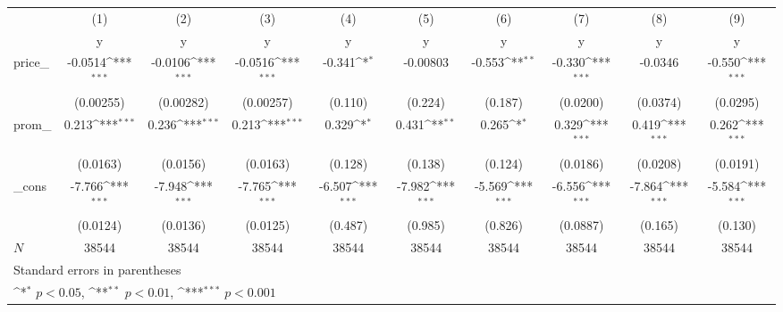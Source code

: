 {
\def\sym#1{\ifmmode^{#1}\else\(^{#1}\)\fi}
\begin{tabular}{l*{9}{c}}
\hline\hline
            &\multicolumn{1}{c}{(1)}&\multicolumn{1}{c}{(2)}&\multicolumn{1}{c}{(3)}&\multicolumn{1}{c}{(4)}&\multicolumn{1}{c}{(5)}&\multicolumn{1}{c}{(6)}&\multicolumn{1}{c}{(7)}&\multicolumn{1}{c}{(8)}&\multicolumn{1}{c}{(9)}\\
            &\multicolumn{1}{c}{y}&\multicolumn{1}{c}{y}&\multicolumn{1}{c}{y}&\multicolumn{1}{c}{y}&\multicolumn{1}{c}{y}&\multicolumn{1}{c}{y}&\multicolumn{1}{c}{y}&\multicolumn{1}{c}{y}&\multicolumn{1}{c}{y}\\
\hline
price\_      &     -0.0514\sym{***}&     -0.0106\sym{***}&     -0.0516\sym{***}&      -0.341\sym{*}  &    -0.00803         &      -0.553\sym{**} &      -0.330\sym{***}&     -0.0346         &      -0.550\sym{***}\\
            &   (0.00255)         &   (0.00282)         &   (0.00257)         &     (0.110)         &     (0.224)         &     (0.187)         &    (0.0200)         &    (0.0374)         &    (0.0295)         \\
[1em]
prom\_       &       0.213\sym{***}&       0.236\sym{***}&       0.213\sym{***}&       0.329\sym{*}  &       0.431\sym{**} &       0.265\sym{*}  &       0.329\sym{***}&       0.419\sym{***}&       0.262\sym{***}\\
            &    (0.0163)         &    (0.0156)         &    (0.0163)         &     (0.128)         &     (0.138)         &     (0.124)         &    (0.0186)         &    (0.0208)         &    (0.0191)         \\
[1em]
\_cons      &      -7.766\sym{***}&      -7.948\sym{***}&      -7.765\sym{***}&      -6.507\sym{***}&      -7.982\sym{***}&      -5.569\sym{***}&      -6.556\sym{***}&      -7.864\sym{***}&      -5.584\sym{***}\\
            &    (0.0124)         &    (0.0136)         &    (0.0125)         &     (0.487)         &     (0.985)         &     (0.826)         &    (0.0887)         &     (0.165)         &     (0.130)         \\
\hline
\(N\)       &       38544         &       38544         &       38544         &       38544         &       38544         &       38544         &       38544         &       38544         &       38544         \\
\hline\hline
\multicolumn{10}{l}{\footnotesize Standard errors in parentheses}\\
\multicolumn{10}{l}{\footnotesize \sym{*} \(p<0.05\), \sym{**} \(p<0.01\), \sym{***} \(p<0.001\)}\\
\end{tabular}
}
